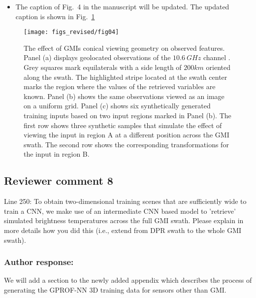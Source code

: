 \begin{itemize}
  \item The caption of Fig.~4 in the manuscript will be updated. The updated caption
    is shown in Fig.~\ref{fig:data_augmentation}
\end{itemize}

\begin{figure}[hbpt]
  \centering
    \DIFdelbeginFL %
\DIFdelendFL \DIFaddbeginFL \texttt{[image: figs\_revised/fig04]}
    \DIFaddendFL \caption{
      The effect of GMIs conical viewing geometry on observed features. Panel
      (a) displays geolocated observations of the $10.6\ \unit{GHz}$ channel
      \DIFaddbeginFL {}\DIFaddendFL . Grey squares mark equilaterals with a side length of
      $200\unit{km}$ oriented along the swath. The highlighted stripe located at
      the swath center marks the region where the values of the retrieved
      variables are known. Panel (b) shows the same observations viewed as an
      image on a uniform grid. Panel (c) shows six synthetically generated
      training inputs based on two input regions marked in Panel (b). The first
      row shows three synthetic samples that simulate the effect of viewing the
      input in region A at a different position across the GMI swath. The second
      row shows the corresponding transformations for the input in region B.
    }
  \label{fig:data_augmentation}
\end{figure}



\subsection*{Reviewer comment 8}

Line 250: To obtain two-dimensional training scenes that are sufficiently wide to train a CNN,
we make use of an intermediate CNN based model to ’retrieve’ simulated brightness
temperatures across the full GMI swath. Please explain in more details how you did this (i.e.,
extend from DPR swath to the whole GMI swath).

\subsubsection*{Author response:}

We will add a section to the newly added appendix which describes the process of
generating the GPROF-NN 3D training data for sensors other than GMI.

